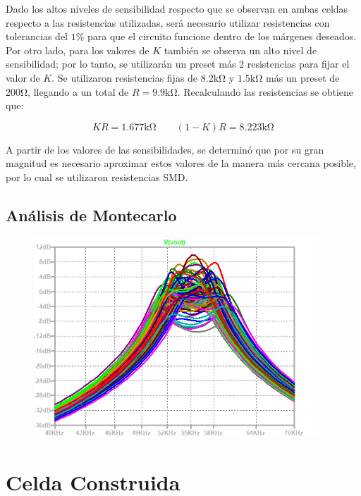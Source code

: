 Dado los altos niveles de sensibilidad respecto que se observan en ambas celdas respecto a las resistencias utilizadas, será necesario utilizar resistencias con tolerancias del $1\%$ para que el circuito funcione dentro de los márgenes deseados.
Por otro lado, para los valores de $K$ también se observa un alto nivel de sensibilidad; por lo tanto, se utilizarán un preset más 2 resistencias para fijar el valor de $K$. Se utilizaron resistencias fijas de $8.2\si{\kilo\ohm}$ y $1.5\si{\kilo\ohm}$ más un preset de $200\si{\ohm}$, llegando a un total de $R = 9.9 \si{\kilo\ohm}$. Recalculando las resistencias se obtiene que:

\begin{equation*}
KR = 1.677\si{\kilo\ohm} \qquad (1-K)R = 8.223 \si{\kilo\ohm}
\end{equation*}

A partir de los valores de las sensibilidades, se determinó que por su gran magnitud es necesario aproximar estos valores de la manera más cercana posible, por lo cual se utilizaron resistencias SMD.

\subsection{Análisis de Montecarlo}

\begin{figure}
\begin{center}
\includegraphics[height=7.5cm]{../Ex2/Informe/montecarlo.png}
\end{center}
\end{figure}


\section{Celda Construida}

